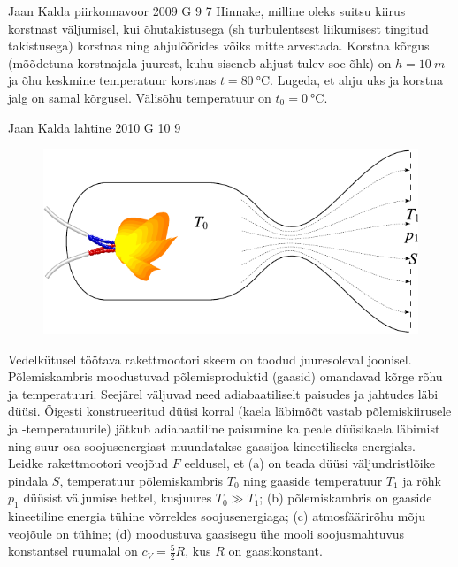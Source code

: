 \documentclass[11pt]{article}
\begin{document}
{%
{Jaan Kalda} %
{piirkonnavoor} %
{2009} %
{G 9} %
{7} %
{
\ifStatement
Hinnake, milline oleks suitsu kiirus korstnast väljumisel, kui õhutakistusega (sh turbulentsest liikumisest tingitud takistusega) korstnas ning ahjulõõrides võiks mitte arvestada.
Korstna kõrgus (mõõdetuna korstnajala juurest, kuhu siseneb ahjust tulev soe õhk) on $h=\SI{10}{m}$ ja õhu keskmine temperatuur korstnas $t=\SI{80}{\celsius}$. Lugeda, et ahju uks ja korstna jalg on samal kõrgusel. Välisõhu temperatuur on $t_0=\SI{0}{\celsius}$.
\fi
}
\newpage


{Jaan Kalda} %
{lahtine} %
{2010} %
{G 10} %
{9} %
{
\ifStatement
\begin{figure}
	\vspace{-3ex}
	\includegraphics[width=\linewidth]{2010-lahg-10-rakettmootor}
	\vspace{-6ex}
\end{figure}
Vedelkütusel töötava rakettmootori skeem on toodud juuresoleval joonisel. Põlemiskambris moodustuvad põlemisproduktid (gaasid) omandavad kõrge rõhu ja temperatuuri. Seejärel väljuvad need adiabaatiliselt paisudes ja jahtudes läbi düüsi. Õigesti konstrueeritud düüsi korral (kaela läbimõõt vastab põlemiskiirusele ja -temperatuurile) jätkub adiabaatiline paisumine ka peale düüsikaela läbimist ning suur osa soojusenergiast muundatakse gaasijoa kineetiliseks energiaks. Leidke rakettmootori veojõud $F$ eeldusel, et (a) on teada düüsi väljundristlõike pindala $S$, temperatuur põlemiskambris $T_0$ ning gaaside temperatuur $T_1$ ja rõhk $p_1$ düüsist väljumise hetkel, kusjuures $T_0 \gg T_1$; (b) põlemiskambris on gaaside kineetiline energia tühine võrreldes soojusenergiaga; (c) atmosfäärirõhu mõju veojõule on tühine; (d) moodustuva gaasisegu ühe mooli soojusmahtuvus konstantsel ruumalal on $c_V = \frac52 R$, kus $R$ on gaasikonstant.
\fi
}
\newpage\subsection{\protect{}}

}
\end{document}

